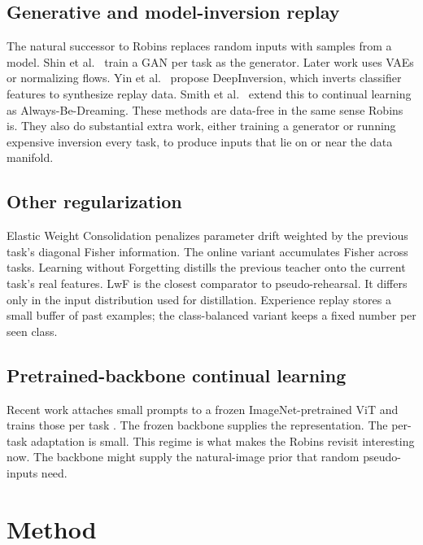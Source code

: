 \documentclass[conference]{IEEEtran}
\begin{document}
\subsection{Generative and model-inversion replay}

The natural successor to Robins replaces random inputs with samples from a
model. Shin et al.\ \citep{shin2017dgr} train a GAN per task as the
generator. Later work uses VAEs or normalizing flows. Yin et al.\
\citep{yin2020deepinversion} propose DeepInversion, which inverts
classifier features to synthesize replay data. Smith et al.\
\citep{smith2021abd} extend this to continual learning as Always-Be-Dreaming.
These methods are data-free in the same sense Robins is. They also do
substantial extra work, either training a generator or running expensive
inversion every task, to produce inputs that lie on or near the data
manifold.

\subsection{Other regularization}

Elastic Weight Consolidation \citep{kirkpatrick2017ewc} penalizes
parameter drift weighted by the previous task's diagonal Fisher
information. The online variant \citep{schwarz2018onlineewc} accumulates
Fisher across tasks. Learning without Forgetting
\citep{li2017lwf} distills the previous teacher onto the current task's
real features. LwF is the closest comparator to pseudo-rehearsal. It
differs only in the input distribution used for distillation. Experience
replay stores a small buffer of past examples; the class-balanced variant
keeps a fixed number per seen class.

\subsection{Pretrained-backbone continual learning}

Recent work attaches small prompts to a frozen ImageNet-pretrained ViT and
trains those per task \citep{wang2022l2p}. The frozen backbone supplies
the representation. The per-task adaptation is small. This regime is what
makes the Robins revisit interesting now. The backbone might supply the
natural-image prior that random pseudo-inputs need.

\section{Method}\label{sec:method}
\end{document}
